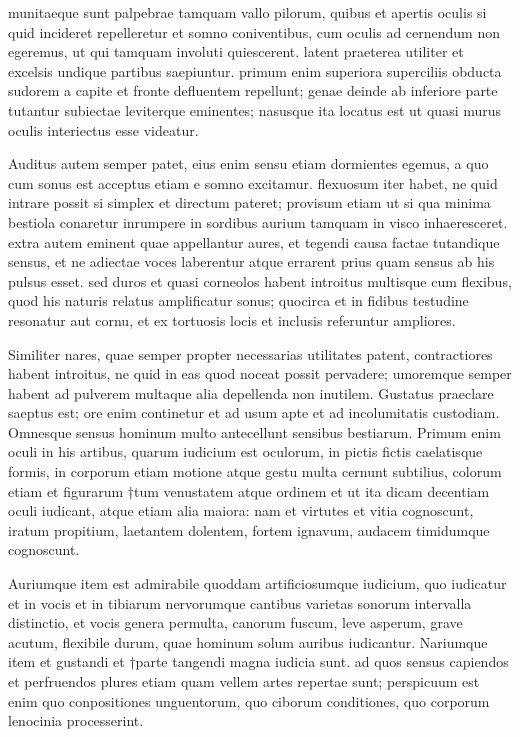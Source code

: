  munitaeque sunt palpebrae tamquam vallo pilorum, quibus et apertis oculis si quid incideret repelleretur et somno coniventibus, cum oculis ad cernendum non egeremus, ut qui tamquam involuti quiescerent. latent praeterea utiliter et excelsis undique partibus saepiuntur. primum enim superiora superciliis obducta sudorem a capite et fronte defluentem repellunt; genae deinde ab inferiore parte tutantur subiectae leviterque eminentes; nasusque ita locatus est ut quasi murus oculis interiectus esse videatur.

 Auditus autem semper patet, eius enim sensu etiam dormientes egemus, a quo cum sonus est acceptus etiam e somno excitamur. flexuosum iter habet, ne quid intrare possit si simplex et directum pateret; provisum etiam ut si qua minima bestiola conaretur inrumpere in sordibus aurium tamquam in visco inhaeresceret. extra autem eminent quae appellantur aures, et tegendi causa factae tutandique sensus, et ne adiectae voces laberentur atque errarent prius quam sensus ab his pulsus esset. sed duros et quasi corneolos habent introitus multisque cum flexibus, quod his naturis relatus amplificatur sonus; quocirca et in fidibus testudine resonatur aut cornu, et ex tortuosis locis et inclusis referuntur ampliores.

 Similiter nares, quae semper propter necessarias utilitates patent, contractiores habent introitus, ne quid in eas quod noceat possit pervadere; umoremque semper habent ad pulverem multaque alia depellenda non inutilem. Gustatus praeclare saeptus est; ore enim continetur et ad usum apte et ad incolumitatis custodiam. Omnesque sensus hominum multo antecellunt sensibus bestiarum. Primum enim oculi in his artibus, quarum iudicium est oculorum, in pictis fictis caelatisque formis, in corporum etiam motione atque gestu multa cernunt subtilius, colorum etiam et figurarum †tum venustatem atque ordinem et ut ita dicam decentiam oculi iudicant, atque etiam alia maiora: nam et virtutes et vitia cognoscunt, iratum propitium, laetantem dolentem, fortem ignavum, audacem timidumque cognoscunt.

 Auriumque item est admirabile quoddam artificiosumque iudicium, quo iudicatur et in vocis et in tibiarum nervorumque cantibus varietas sonorum intervalla distinctio, et vocis genera permulta, canorum fuscum, leve asperum, grave acutum, flexibile durum, quae hominum solum auribus iudicantur. Nariumque item et gustandi et †parte tangendi magna iudicia sunt. ad quos sensus capiendos et perfruendos plures etiam quam vellem artes repertae sunt; perspicuum est enim quo conpositiones unguentorum, quo ciborum conditiones, quo corporum lenocinia processerint.

